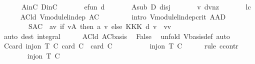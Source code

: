 \begin{isabellebody}
\ \ \ \ \ \ A{\isacharprime}inC\ DinC\ \isanewline
\ \ \ \ \ \ e{\isacharunderscore}fun\ d\ \isanewline
\ \ \ \ \ \ A{\isacharprime}sub\ D\ disj\ \isanewline
\ \ \ \ \ \ v\ dvnz\ \isanewline
\ \ \ \ \ \ lc{}\isanewline
\ \ \ \ \isamarkupfalse%
\ AC{\isacharunderscore}ld{\isacharcolon}\ {\isachardoublequoteopen}V{\isachardot}module{\isachardot}lin{\isacharunderscore}dep\ {\isacharparenleft}A{\isasymunion}C{\isacharparenright}{\isachardoublequoteclose}\ \isanewline
\ \ \ \ \ \ \isamarkupfalse%
\ {\isacharparenleft}intro\ V{\isachardot}module{\isachardot}lin{\isacharunderscore}dep{\isacharunderscore}crit{\isacharbrackleft}\ {\isacharquery}A{\isacharequal}{\isachardoublequoteopen}A{\isacharprime}{\isasymunion}D{\isachardoublequoteclose}\ \ \isanewline
\ \ \ \ \ \ \ \ {\isacharquery}S{\isacharequal}{\isachardoublequoteopen}A{\isasymunion}C{\isachardoublequoteclose}\ \ {\isacharquery}a{\isacharequal}{\isachardoublequoteopen}{\isasymlambda}v{\isachardot}\ if\ v{\isasymin}A{\isacharprime}\ then\ a{\isacharprime}\ v\ else\ {\isasymominus}\isactrlbsub K\isactrlesub {\isasymone}\isactrlbsub K\isactrlesub {\isasymotimes}\isactrlbsub K\isactrlesub \ d\ v{\isachardoublequoteclose}\ \ {\isacharquery}v{\isacharequal}{\isachardoublequoteopen}v{\isachardoublequoteclose}{\isacharbrackright}{\isacharparenright}\isanewline
\ \ \ \ \ \ \ \ \ \ \ \isamarkupfalse%
\ {\isacharparenleft}auto\ dest{\isacharcolon}\ integral{\isacharparenright}\isanewline
\ \ \ \ \isamarkupfalse%
\ AC{\isacharunderscore}ld\ ACbasis\ \isamarkupfalse%
\ False\ \isamarkupfalse%
\ {\isacharparenleft}unfold\ V{\isachardot}basis{\isacharunderscore}def{\isacharcomma}\ auto{\isacharparenright}\isanewline
\ \ \isamarkupfalse%
\isanewline
\ \ \isamarkupfalse%
\ C{\isacharprime}{\isacharunderscore}card{\isacharcolon}\ {\isachardoublequoteopen}inj{\isacharunderscore}on\ T\ C{\isachardoublequoteclose}\ {\isachardoublequoteopen}card\ C\ {\isacharequal}\ card\ {\isacharquery}C{\isacharprime}{\isachardoublequoteclose}\isanewline
\ \ \isamarkupfalse%
\ {\isacharminus}\isanewline
\ \ \ \ \isamarkupfalse%
\ {\isachardoublequoteopen}inj{\isacharunderscore}on\ T\ C{\isachardoublequoteclose}\isanewline
\ \ \ \ \isamarkupfalse%
\ {\isacharparenleft}rule\ ccontr{\isacharparenright}\isanewline
\ \ \ \ \ \ \isamarkupfalse%
\ {\isachardoublequoteopen}{\isasymnot}inj{\isacharunderscore}on\ T\ C{\isachardoublequoteclose}\isanewline

\end{isabellebody}
